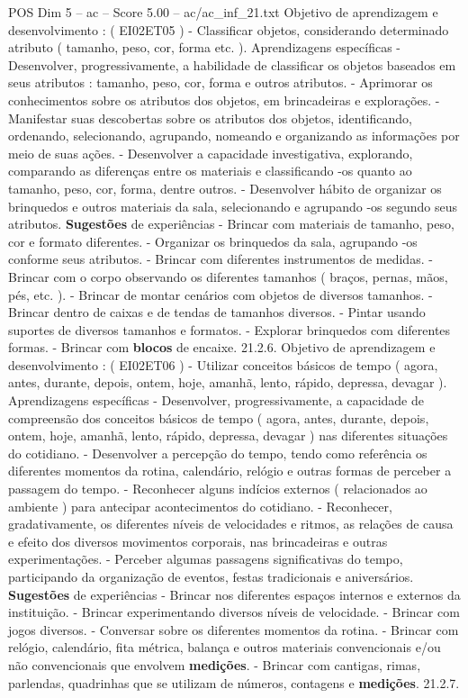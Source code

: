 \begin{textsample}{POS Dim 5 – ac – Score 5.00 – ac/ac\_inf\_21.txt}
Objetivo de aprendizagem e desenvolvimento : ( EI02ET05 ) - Classificar objetos, considerando determinado atributo ( tamanho, peso, cor, forma etc. ).
Aprendizagens específicas - Desenvolver, progressivamente, a habilidade de classificar os objetos baseados em seus atributos : tamanho, peso, cor, forma e outros atributos. - Aprimorar os conhecimentos sobre os atributos dos objetos, em brincadeiras e explorações. - Manifestar suas descobertas sobre os atributos dos objetos, identificando, ordenando, selecionando, agrupando, nomeando e organizando as informações por meio de suas ações. - Desenvolver a capacidade investigativa, explorando, comparando as diferenças entre os materiais e classificando -os quanto ao tamanho, peso, cor, forma, dentre outros. - Desenvolver hábito de organizar os brinquedos e outros materiais da sala, selecionando e agrupando -os segundo seus atributos. \textbf{Sugestões} de experiências - Brincar com materiais de tamanho, peso, cor e formato diferentes. - Organizar os brinquedos da sala, agrupando -os conforme seus atributos. - Brincar com diferentes instrumentos de medidas. - Brincar com o corpo observando os diferentes tamanhos ( braços, pernas, mãos, pés, etc. ). - Brincar de montar cenários com objetos de diversos tamanhos. - Brincar dentro de caixas e de tendas de tamanhos diversos. - Pintar usando suportes de diversos tamanhos e formatos. - Explorar brinquedos com diferentes formas. - Brincar com \textbf{blocos} de encaixe. 21.2.6.
Objetivo de aprendizagem e desenvolvimento : ( EI02ET06 ) - Utilizar conceitos básicos de tempo ( agora, antes, durante, depois, ontem, hoje, amanhã, lento, rápido, depressa, devagar ).
Aprendizagens específicas - Desenvolver, progressivamente, a capacidade de compreensão dos conceitos básicos de tempo ( agora, antes, durante, depois, ontem, hoje, amanhã, lento, rápido, depressa, devagar ) nas diferentes situações do cotidiano. - Desenvolver a percepção do tempo, tendo como referência os diferentes momentos da rotina, calendário, relógio e outras formas de perceber a passagem do tempo. - Reconhecer alguns indícios externos ( relacionados ao ambiente ) para antecipar acontecimentos do cotidiano. - Reconhecer, gradativamente, os diferentes níveis de velocidades e ritmos, as relações de causa e efeito dos diversos movimentos corporais, nas brincadeiras e outras experimentações. - Perceber algumas passagens significativas do tempo, participando da organização de eventos, festas tradicionais e aniversários. \textbf{Sugestões} de experiências - Brincar nos diferentes espaços internos e externos da instituição. - Brincar experimentando diversos níveis de velocidade. - Brincar com jogos diversos. - Conversar sobre os diferentes momentos da rotina. - Brincar com relógio, calendário, fita métrica, balança e outros materiais convencionais e/ou não convencionais que envolvem \textbf{medições}. - Brincar com cantigas, rimas, parlendas, quadrinhas que se utilizam de números, contagens e \textbf{medições}. 21.2.7.

\end{textsample}
